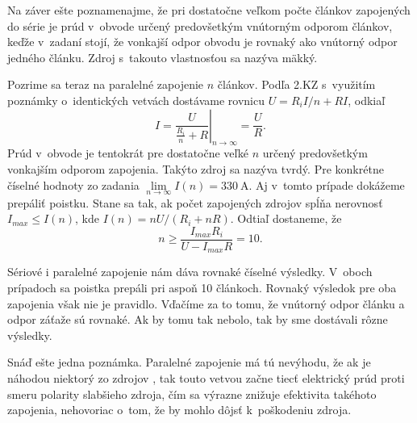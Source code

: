Na záver ešte poznamenajme, že pri dostatočne veľkom počte článkov
zapojených do série je prúd v~obvode určený predovšetkým vnútorným
odporom článkov, keďže v~zadaní stojí, že vonkajší odpor obvodu je
rovnaký ako vnútorný odpor jedného článku. Zdroj s~takouto vlastnosťou
sa nazýva mäkký.



Pozrime sa teraz na paralelné zapojenie $n$ článkov. Podľa 2.KZ
s~využitím poznámky o~identických vetvách dostávame rovnicu $U=R_{i}I/n+RI$,
odkiaľ 
\[
I=\left.\frac{U}{\frac{R_{i}}{n}+R}\right|_{n\rightarrow\infty}=\frac{U}{R}\textrm{.}
\]
Prúd v~obvode je tentokrát pre dostatočne veľké $n$ určený predovšetkým
vonkajším odporom zapojenia. Takýto zdroj sa nazýva tvrdý. Pre konkrétne
číselné hodnoty zo zadania $\underset{n\rightarrow\infty}{\lim}I\left(n\right)=\SI{330}{\ampere}$.
Aj v~tomto prípade dokážeme prepáliť poistku. Stane sa tak, ak počet
zapojených zdrojov spĺňa nerovnosť $I_{max}\leq I\left(n\right)$,
kde $I\left(n\right)=nU/(R_{i}+nR)$. Odtiaľ dostaneme, že 
\[
n\geq\frac{I_{max}R_{i}}{U-I_{max}R}=10\textrm{.}
\]

Sériové i paralelné zapojenie nám dáva rovnaké číselné výsledky.
V~oboch prípadoch sa poistka prepáli pri aspoň 10 článkoch. Rovnaký
výsledok pre oba zapojenia však nie je pravidlo. Vďačíme za to tomu,
že vnútorný odpor článku a odpor záťaže sú rovnaké. Ak by tomu tak
nebolo, tak by sme dostávali rôzne výsledky.

Snáď ešte jedna poznámka. Paralelné zapojenie má tú nevýhodu, že ak
je náhodou niektorý zo zdrojov , tak touto vetvou začne
tiecť elektrický prúd proti smeru polarity slabšieho zdroja, čím sa
výrazne znižuje efektivita takéhoto zapojenia, nehovoriac o~tom, že
by mohlo dôjsť k~poškodeniu zdroja.



